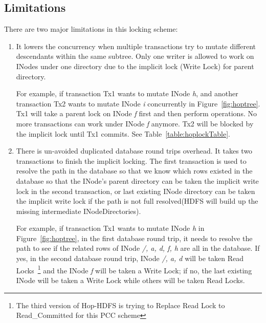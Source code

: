 \subsection{Limitations}

\noindent There are two major limitations in this locking scheme:
\begin{enumerate}[noitemsep]
	\item It lowers the concurrency when multiple transactions try to mutate different descendants within the same subtree. Only one writer is allowed to work on INodes under one directory due to the implicit lock (Write Lock) for parent directory.
	
	 For example, if transaction Tx1 wants to mutate INode \textit{h}, and another transaction Tx2 wants to mutate INode \textit{i} concurrently in Figure~\ref{fig:hoptree}. Tx1 will take a parent lock on INode \textit{f} first and then perform operations. No more transactions can work under INode \textit{f} anymore. Tx2 will be blocked by the implicit lock until Tx1 commits. See Table~\ref{table:hoplockTable}.
	
	\item There is un-avoided duplicated database round trips overhead. It takes two transactions to finish the implicit locking. The first transaction is used to resolve the path in the database so that we know which rows existed in the database so that the INode's parent directory can be taken the implicit write lock in the second transaction, or last existing INode directory can be taken the implicit write lock if the path is not full resolved(HDFS will build up the missing intermediate INodeDirectories).
	
	 For example, if transaction Tx1 wants to mutate INode \textit{h} in Figure~\ref{fig:hoptree}, in the first database round trip, it needs to resolve the path to see if the related rows of INode\textit{ /, a, d, f, h} are all in the database. If yes, in the second database round trip, INode\textit{ /, a, d} will be taken Read Locks~\footnote{The third version of Hop-HDFS is trying to Replace Read Lock to Read\_Committed for this PCC scheme} and the INode \textit{f} will be taken a Write Lock; if no, the last existing INode will be taken a Write Lock while others will be taken Read Locks.
\end{enumerate}

